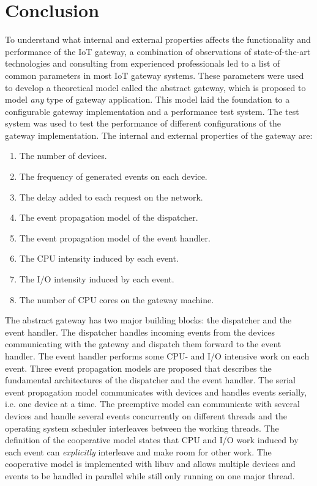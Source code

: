 \chapter{Conclusion}
\label{cha:conclusion}

To understand what internal and external properties affects the functionality
and performance of the IoT gateway, a combination of observations of
state-of-the-art technologies and consulting from experienced professionals led
to a list of common parameters in most IoT gateway systems. These parameters
were used to develop a theoretical model called the abstract gateway, which is
proposed to model \textit{any} type of gateway application. This model laid the
foundation to a configurable gateway implementation and a performance test
system. The test system was used to test the performance of different
configurations of the gateway implementation. The internal and external
properties of the gateway are:

\begin{enumerate}

    \item The number of devices.
    \item The frequency of generated events on each device.
    \item The delay added to each request on the network.
    \item The event propagation model of the dispatcher.
    \item The event propagation model of the event handler.
    \item The CPU intensity induced by each event.
    \item The I/O intensity induced by each event.
    \item The number of CPU cores on the gateway machine.

\end{enumerate}

The abstract gateway has two major building blocks: the dispatcher and the
event handler. The dispatcher handles incoming events from the devices
communicating with the gateway and dispatch them forward to the event handler.
The event handler performs some CPU- and I/O intensive work on each event.
Three event propagation models are proposed that describes the fundamental
architectures of the dispatcher and the event handler. The serial event
propagation model communicates with devices and handles events serially, i.e.
one device at a time. The preemptive model can communicate with several devices
and handle several events concurrently on different threads and the operating
system scheduler interleaves between the working threads. The definition of the
cooperative model states that CPU and I/O work induced by each event can
\textit{explicitly} interleave and make room for other work. The cooperative
model is implemented with libuv and allows multiple devices and events to be
handled in parallel while still only running on one major thread.

